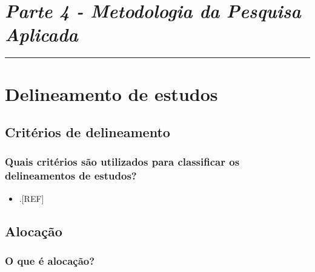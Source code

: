 \documentclass[
  a4paper,
]{book}
\providecommand{\tightlist}{%
  \setlength{\itemsep}{0pt}\setlength{\parskip}{0pt}}
\begin{document}

\hypertarget{parte-4---metodologia-da-pesquisa-aplicada}{%
\chapter*{\texorpdfstring{\emph{Parte 4 - Metodologia da Pesquisa Aplicada}}{Parte 4 - Metodologia da Pesquisa Aplicada}}\label{parte-4---metodologia-da-pesquisa-aplicada}}

\markboth{}{}
\par\noindent\rule{\textwidth}{0.05in}

\hypertarget{delineamento-estudos}{%
\chapter{\texorpdfstring{\textbf{Delineamento de estudos}}{Delineamento de estudos}}\label{delineamento-estudos}}

\hypertarget{criterios-delineamento}{%
\section{Critérios de delineamento}\label{criterios-delineamento}}

\hypertarget{quais-crituxe9rios-suxe3o-utilizados-para-classificar-os-delineamentos-de-estudos}{%
\subsection{Quais critérios são utilizados para classificar os delineamentos de estudos?}\label{quais-crituxe9rios-suxe3o-utilizados-para-classificar-os-delineamentos-de-estudos}}

\begin{itemize}
\tightlist
\item
  .{[}REF{]}
\end{itemize}

\hypertarget{alocacao}{%
\section{Alocação}\label{alocacao}}

\hypertarget{o-que-uxe9-alocauxe7uxe3o}{%
\subsection{O que é alocação?}\label{o-que-uxe9-alocauxe7uxe3o}}
\end{document}
